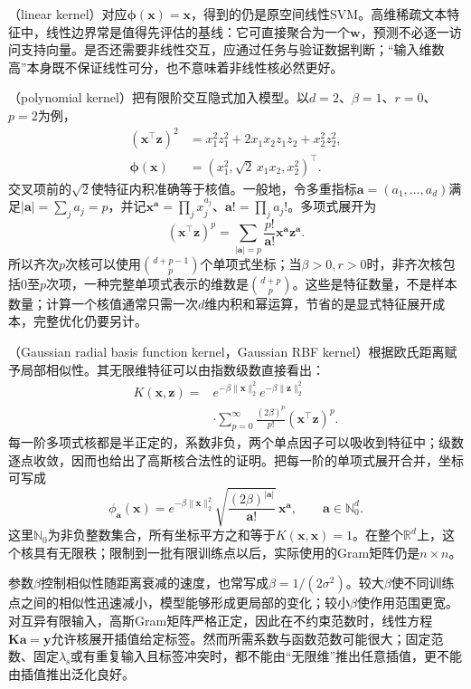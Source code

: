 （linear kernel）对应$\bm{\phi}(\bm{x})=\bm{x}$，得到的仍是原空间线性SVM。高维稀疏文本特征中，线性边界常是值得先评估的基线：它可直接聚合为一个$\bm{w}$，预测不必逐一访问支持向量。是否还需要非线性交互，应通过任务与验证数据判断；“输入维数高”本身既不保证线性可分，也不意味着非线性核必然更好。

（polynomial kernel）把有限阶交互隐式加入模型。以$d=2$、$\beta=1$、$r=0$、$p=2$为例，
\[
  \begin{aligned}
    (\bm{x}^{\top}\bm{z})^2
      &=x_1^2z_1^2+2x_1x_2z_1z_2+x_2^2z_2^2,\\
    \bm{\phi}(\bm{x})
      &=(x_1^2,\sqrt2\,x_1x_2,x_2^2)^{\top}.
  \end{aligned}
\]
交叉项前的$\sqrt2$使特征内积准确等于核值。一般地，令多重指标$\bm{a}=(a_1,\ldots,a_d)$满足$|\bm{a}|=\sum_j a_j=p$，并记$\bm{x}^{\bm{a}}=\prod_j x_j^{a_j}$、$\bm{a}!=\prod_j a_j!$。多项式展开为
\[
  (\bm{x}^{\top}\bm{z})^p
  =\sum_{|\bm{a}|=p}\frac{p!}{\bm{a}!}
     \bm{x}^{\bm{a}}\bm{z}^{\bm{a}}.
\]
所以齐次$p$次核可以使用$\binom{d+p-1}{p}$个单项式坐标；当$\beta>0,r>0$时，非齐次核包括$0$至$p$次项，一种完整单项式表示的维数是$\binom{d+p}{p}$。这些是特征数量，不是样本数量；计算一个核值通常只需一次$d$维内积和幂运算，节省的是显式特征展开成本，完整优化仍要另计。

（Gaussian radial basis function kernel，Gaussian RBF kernel）根据欧氏距离赋予局部相似性。其无限维特征可以由指数级数直接看出：
\begin{equation}
  \begin{aligned}
    K(\bm{x},\bm{z})
      ={}&e^{-\beta\lVert\bm{x}\rVert_2^2}
          e^{-\beta\lVert\bm{z}\rVert_2^2}\\
       &\cdot\sum_{p=0}^{\infty}
          \frac{(2\beta)^p}{p!}
          (\bm{x}^{\top}\bm{z})^p.
  \end{aligned}
  \label{eq:classification-svm-rbf-expansion}
\end{equation}
每一阶多项式核都是半正定的，系数非负，两个单点因子可以吸收到特征中；级数逐点收敛，因而也给出了高斯核合法性的证明。把每一阶的单项式展开合并，坐标可写成
\[
  \phi_{\bm{a}}(\bm{x})
  =e^{-\beta\lVert\bm{x}\rVert_2^2}
     \sqrt{\frac{(2\beta)^{|\bm{a}|}}{\bm{a}!}}\,
     \bm{x}^{\bm{a}},
  \qquad \bm{a}\in\mathbb{N}_0^d.
\]
这里$\mathbb{N}_0$为非负整数集合，所有坐标平方之和等于$K(\bm{x},\bm{x})=1$。在整个$\mathbb{R}^d$上，这个核具有无限秩；限制到一批有限训练点以后，实际使用的Gram矩阵仍是$n\times n$。

参数$\beta$控制相似性随距离衰减的速度，也常写成$\beta=1/(2\sigma^2)$。较大$\beta$使不同训练点之间的相似性迅速减小，模型能够形成更局部的变化；较小$\beta$使作用范围更宽。对互异有限输入，高斯Gram矩阵严格正定，因此在不约束范数时，线性方程$\bm{K}\bm{a}=\bm{y}$允许核展开插值给定标签。然而所需系数与函数范数可能很大；固定范数、固定$\lambda_{\mathrm{s}}$或有重复输入且标签冲突时，都不能由“无限维”推出任意插值，更不能由插值推出泛化良好。

